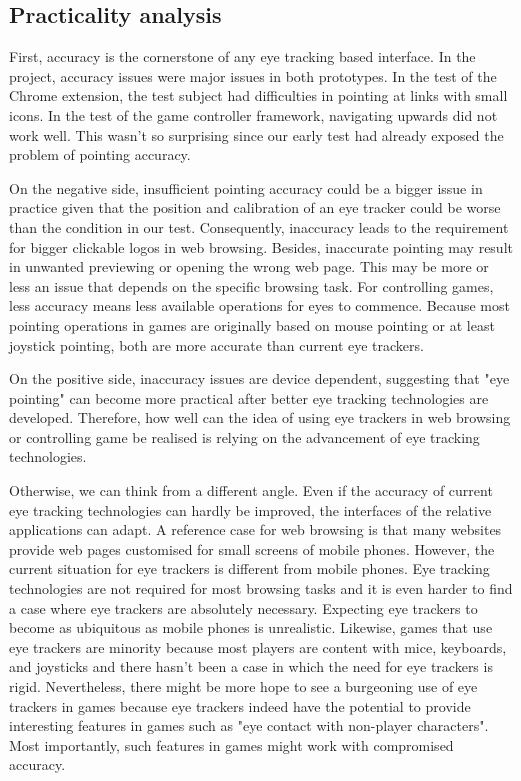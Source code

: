 \documentclass[english]{tktltiki}
\begin{document}
\subsection{Practicality analysis}

First, accuracy is the cornerstone of any eye tracking based interface. In the project, accuracy issues were major issues in both prototypes. In the test of the Chrome extension, the test subject had difficulties in pointing at links with small icons. In the test of the game controller framework, navigating upwards did not work well. This wasn't so surprising since our early test had already exposed the problem of pointing accuracy. 

On the negative side, insufficient pointing accuracy could be a bigger issue in practice given that the position and calibration of an eye tracker could be worse than the condition in our test. Consequently, inaccuracy leads to the requirement for bigger clickable logos in web browsing. Besides, inaccurate pointing may result in unwanted previewing or opening the wrong web page. This may be more or less an issue that depends on the specific browsing task. For controlling games, less accuracy means less available operations for eyes to commence. Because most pointing operations in games are originally based on mouse pointing or at least joystick pointing, both are more accurate than current eye trackers.

On the positive side, inaccuracy issues are device dependent, suggesting that "eye pointing" can become more practical after better eye tracking technologies are developed. Therefore, how well can the idea of using eye trackers in web browsing or controlling game be realised is relying on the advancement of eye tracking technologies. 

Otherwise, we can think from a different angle. Even if the accuracy of current eye tracking technologies can hardly be improved, the interfaces of the relative applications can adapt. A reference case for web browsing is that many websites provide web pages customised for small screens of mobile phones. However, the current situation for eye trackers is different from mobile phones. Eye tracking technologies are not required for most browsing tasks and it is even harder to find a case where eye trackers are absolutely necessary. Expecting eye trackers to become as ubiquitous as mobile phones is unrealistic. Likewise, games that use eye trackers are minority because most players are content with mice, keyboards, and joysticks and there hasn't been a case in which the need for eye trackers is rigid. Nevertheless, there might be more hope to see a burgeoning use of eye trackers in games because eye trackers indeed have the potential to provide interesting features in games such as "eye contact with non-player characters". Most importantly, such features in games might work with compromised accuracy.
\end{document}
